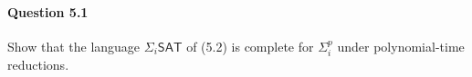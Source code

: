\paragraph{Question 5.1} Show that the language $\Sigma_i\mathsf{SAT}$ of (5.2) is complete for $\Sigma_i^p$ under polynomial-time reductions.